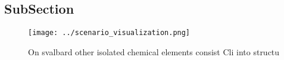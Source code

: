 \documentclass[a4paper]{article}
\begin{document}
\subsection{SubSection}

\begin{figure}
\centering
\texttt{[image: ../scenario\_visualization.png]}
\caption{On svalbard other isolated chemical elements consist Cli into structu
}
\end{figure}
 
\end{document}
